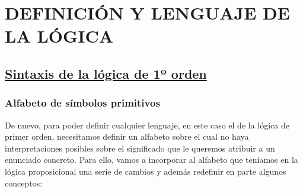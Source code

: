 \documentclass[10pt,a4paper,openright]{book}
\begin{document}
\section*{DEFINICIÓN Y LENGUAJE DE LA LÓGICA}
\subsection*{\underline{Sintaxis de la lógica de 1º orden}}
\subsubsection*{Alfabeto de símbolos primitivos}
De nuevo, para poder definir cualquier lenguaje, en este caso el de la lógica de primer orden, necesitamos definir un alfabeto sobre el cual no haya interpretaciones posibles sobre el significado que le queremos atribuir a un enunciado concreto. Para ello, vamos a incorporar al alfabeto que teníamos en la lógica proposicional una serie de cambios y además redefinir en parte algunos conceptos:
\end{document}
